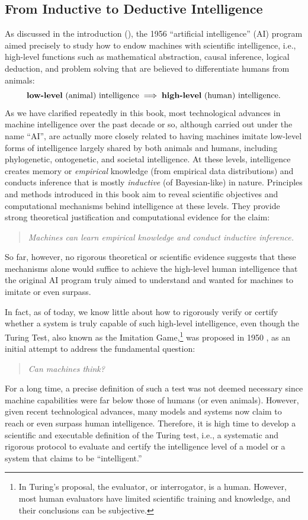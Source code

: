 \documentclass[../../book-main.tex]{subfiles}
\begin{document}
\subsection{From Inductive to Deductive Intelligence}
As discussed in the introduction (), the 1956
``artificial intelligence'' (AI) program aimed precisely to study how
to endow machines with scientific intelligence, i.e., high-level
functions such as mathematical abstraction, causal inference, logical deduction, and
problem solving that are believed to differentiate humans from animals:
\begin{equation}
    \text{\textbf{low-level} (animal) intelligence} \; \Longrightarrow \;
    \text{\textbf{high-level} (human) intelligence.}
\end{equation}
As we have clarified repeatedly in this book, most technological
advances in machine intelligence over the past decade or so, although
carried out under the name ``AI'', are actually more closely related
to having machines imitate low-level forms of intelligence largely
shared by both animals and humans, including phylogenetic,
ontogenetic, and societal intelligence. At these levels, intelligence
creates memory or \textit{empirical} knowledge (from empirical data distributions) and conducts inference
that is mostly \textit{inductive} (of Bayesian-like) in nature. Principles and methods introduced in this book aim to reveal scientific objectives and
computational mechanisms behind intelligence at these levels. They
provide strong theoretical justification and computational evidence
for the claim:
\begin{quote}
    \centering
    \textit{Machines can learn empirical knowledge and conduct
    inductive inference.}
\end{quote}
So far, however, no rigorous theoretical or scientific evidence
suggests that these mechanisms alone would suffice to achieve the
high-level human intelligence that the original AI program truly
aimed to understand and wanted for machines to imitate or even surpass.

In fact, as of today, we know little about how to rigorously verify
or certify whether a system is truly capable of such high-level
intelligence, even though the Turing Test, also known as the
Imitation Game,\footnote{In Turing's proposal, the evaluator, or
    interrogator, is a human. However, most human evaluators have limited
    scientific training and knowledge, and their conclusions can be
subjective.} was proposed in 1950 \citep{Turing-1950}, as an initial
attempt to address the fundamental question:
\begin{quote}
    \centering
    \textit{Can machines think?}
\end{quote}
For a long time, a precise definition of such a test was not deemed
necessary since machine capabilities were far below those of humans
(or even animals). However, given recent technological advances, many
models and systems now claim to reach or even surpass human
intelligence. Therefore, it is high time to develop a scientific and
executable definition of the Turing test, i.e., a systematic and
rigorous protocol to evaluate and certify the intelligence level of a
model or a system that claims to be ``intelligent.''
\end{document}
